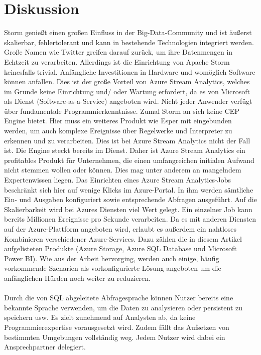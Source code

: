\section{Diskussion}
Storm genießt einen großen Einfluss in der Big-Data-Community und ist äußerst skalierbar, fehlertolerant und kann in bestehende Technologien integriert werden. Große Namen wie Twitter greifen darauf zurück, um ihre Datenmengen in Echtzeit zu verarbeiten. Allerdings ist die Einrichtung von Apache Storm keinesfalls trivial. Anfängliche Investitionen in Hardware und womöglich Software können anfallen. Dies ist der große Vorteil von Azure Stream Analytics, welches im Grunde keine Einrichtung und/ oder Wartung erfordert, da es von Microsoft als Dienst (Software-as-a-Service) angeboten wird. Nicht jeder Anwender verfügt über fundamentale Programmierkenntnisse. Zumal Storm an sich keine CEP Engine bietet. Hier muss ein weiteres Produkt wie Esper mit eingebunden werden, um auch komplexe Ereignisse über Regelwerke und Interpreter zu erkennen und zu verarbeiten. Dies ist bei Azure Stream Analytics nicht der Fall ist. Die Engine steckt bereits im Dienst. Daher ist Azure Stream Analytics ein profitables Produkt für Unternehmen, die einen umfangreichen initialen Aufwand nicht stemmen wollen oder können. Dies mag unter anderem an mangelndem Expertenwissen liegen. Das Einrichten eines Azure Stream Analytics-Jobs beschränkt sich hier auf wenige Klicks im Azure-Portal. In ihm werden sämtliche Ein- und Ausgaben konfiguriert sowie entsprechende Abfragen ausgeführt. Auf die Skalierbarkeit wird bei Azures Diensten viel Wert gelegt. Ein einzelner Job kann bereits Millionen Ereignisse pro Sekunde verarbeiten. Da es mit anderen Diensten auf der Azure-Plattform angeboten wird, erlaubt es außerdem ein nahtloses Kombinieren verschiedener Azure-Services. Dazu zählen die in diesem Artikel aufgelisteten Produkte (Azure Storage, Azure SQL Database und Microsoft Power BI). Wie aus der Arbeit hervorging, werden auch einige, häufig vorkommende Szenarien als vorkonfigurierte Lösung angeboten um die anfänglichen Hürden noch weiter zu reduzieren.\\ \\
Durch die von SQL abgeleitete Abfragesprache können Nutzer bereits eine bekannte Sprache verwenden, um die Daten zu analysieren oder persistent zu speichern usw. Es zielt zunehmend auf Analysten ab, da keine Programmierexpertise vorausgesetzt wird. Zudem fällt das Aufsetzen von bestimmten Umgebungen vollständig weg. Jedem Nutzer wird dabei ein Ansprechpartner delegiert.\\ \\
